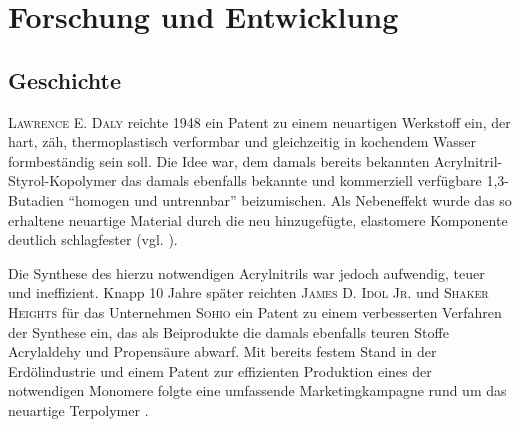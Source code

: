 \chapter{Forschung und Entwicklung}
    \section{Geschichte}\label{sec:geschichte}
        \textsc{Lawrence E. Daly} reichte 1948 ein Patent zu einem neuartigen Werkstoff ein, der hart, zäh, thermoplastisch verformbar
        und gleichzeitig in kochendem Wasser formbeständig sein soll. Die Idee war, dem damals bereits bekannten Acrylnitril-Styrol-Kopolymer
        das damals ebenfalls bekannte und kommerziell verfügbare 1,3-Butadien \enquote{homogen und untrennbar}
        beizumischen. Als Nebeneffekt wurde das so erhaltene neuartige Material durch die neu hinzugefügte, elastomere Komponente
        deutlich schlagfester (vgl. \cite{ABS.patent.1948.Daly.10191946}).
        
        Die Synthese des hierzu notwendigen Acrylnitrils war jedoch aufwendig, teuer und ineffizient. Knapp 10 Jahre später
        reichten \textsc{James D. Idol Jr.} und \textsc{Shaker Heights} für das Unternehmen \textsc{Sohio} ein Patent zu einem verbesserten Verfahren
        der Synthese ein, das als Beiprodukte die damals ebenfalls teuren Stoffe Acrylaldehy und Propensäure abwarf. Mit
        bereits festem Stand in der Erdölindustrie und einem Patent zur effizienten Produktion eines der notwendigen Monomere        
        folgte eine umfassende Marketingkampagne rund um das neuartige Terpolymer \cite{history.of.sohio.process.booklet.2021,sohio.process.patent.1959.9201957}.
        
